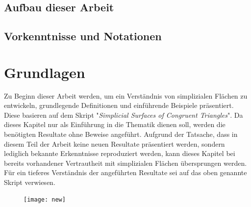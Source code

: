 \documentclass[12pt,titlepage,twoside,cleardoublepage]{article}
\theoremstyle{nummermitklammern}
\numberwithin{equation}{section}
\begin{document}
\subsection{Aufbau dieser Arbeit}
\subsection{Vorkenntnisse und Notationen}
\section{Grundlagen} \label{Grundlagen}
Zu Beginn dieser Arbeit werden, um ein Verständnis von simplizialen Flächen zu entwickeln, grundlegende Definitionen und einführende Beispiele präsentiert. Diese basieren auf dem Skript "\emph{Simplicial Surfaces of Congruent Triangles}". Da dieses Kapitel nur als Einführung in die Thematik dienen soll, werden die benötigten Resultate ohne Beweise angeführt. Aufgrund der Tatsache, dass in diesem Teil der Arbeit keine neuen Resultate präsentiert werden, sondern lediglich bekannte Erkenntnisse reproduziert werden, kann dieses Kapitel bei bereits vorhandener Vertrautheit mit simplizialen Flächen übersprungen werden. Für ein tieferes Verständnis der angeführten Resultate sei auf das oben genannte Skript verwiesen.
\begin{figure}[H]
\begin{center}
\texttt{[image: new]}
\end{center}
\end{figure}
\end{document}
